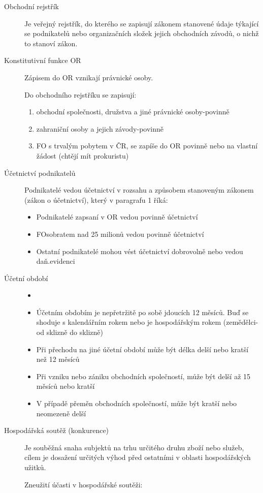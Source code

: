 \documentclass[11pt,a4paper,twoside]{book}
\begin{document}
\begin{description}
			\item[Obchodní rejstřík] Je veřejný rejstřík, do kterého se zapisují zákonem stanovené údaje týkající se podnikatelů nebo organizačních složek jejich obchodních závodů, o nichž to stanoví zákon.
			\item[Konstitutivní funkce OR] Zápisem do OR vznikají právnické osoby. \par Do obchodního rejstříku se zapisují:
				\begin{enumerate}
					\item obchodní společnosti, družstva a jiné právnické osoby-povinně
					\item zahraniční osoby a jejich závody-povinně
					\item FO s trvalým pobytem v ČR, se zapíše do OR povinně nebo na vlastní žádost (chtějí mít prokuristu)			
				\end{enumerate}
			\item[Účetnictví podnikatelů] Podnikatelé vedou účetnictví v rozsahu a způsobem stanoveným zákonem (zákon o účetnictví), který v paragrafu 1 říká:
				\begin{itemize}
					\item Podnikatelé zapsaní v OR vedou povinně účetnictví
					\item FOsobratem nad 25 milionů vedou povinně účetnictví
					\item Ostatní podnikatelé mohou vést účetnictví dobrovolně nebo vedou daň.evidenci
				\end{itemize}
			\item[Účetní období]
				\begin{itemize}
					\item []
					\item Účetním obdobím je nepřetržitě po sobě jdoucích 12 měsíců. Buď se shoduje s kalendářním rokem nebo je hospodářským rokem (zemědělci-od sklizně do sklizně)
					\item Při přechodu na jiné účetní období může být délka delší nebo kratší než 12 měsíců
					\item Při vzniku nebo zániku obchodních společností, může být delší až 15 měsíců nebo kratší
					\item V případě přeměn obchodních společností, může být kratší nebo neomezeně delší
				\end{itemize}
			\item[Hospodářská soutěž (konkurence)] Je souběžná snaha subjektů na trhu určitého druhu zboží nebo služeb, cílem je dosažení určitých výhod před ostatními v oblasti hospodářských užitků.\par Zneužití účasti v hospodářské soutěži:

\end{description}
\end{document}
